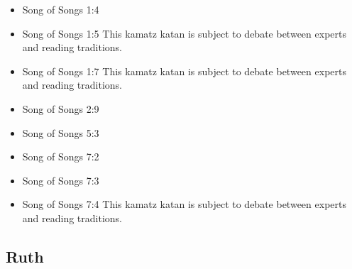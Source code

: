 \documentclass[14pt]{book}
\begin{document}
\begin{multicols}{2}\begin{itemize}
		
	\item Song of Songs 1:4
	
	\item Song of Songs 1:5 This kamatz katan is subject to debate between experts and reading traditions.
	
	\item Song of Songs 1:7 This kamatz katan is subject to debate between experts and reading traditions.
	
	\item Song of Songs 2:9
	
	\item Song of Songs 5:3
	
	\item Song of Songs 7:2
	
	\item Song of Songs 7:3
	
	\item Song of Songs 7:4 This kamatz katan is subject to debate between experts and reading traditions.
	
\end{itemize}\end{multicols}

\subsection{Ruth}
\end{document}
